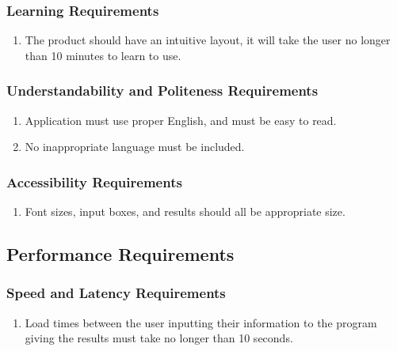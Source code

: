 \documentclass[english]{article}
\begin{document}

\subsubsection{Learning Requirements}
\label{ssub:learning_requirements}
\begin{enumerate}[{LR}1. ]
\item The product should have an intuitive layout, it will take the user no longer than 10 minutes to learn to use.
\end{enumerate}

\subsubsection{Understandability and Politeness Requirements}
\label{ssub:understandability_and_politeness_requirements}
\begin{enumerate}[{UPR}1. ]
\item Application must use proper English, and must be easy to read.

\item No inappropriate language must be included.
\end{enumerate}

\subsubsection{Accessibility Requirements}
\label{ssub:accessibility_requirements}
\begin{enumerate}[{ACR}1. ]
\item Font sizes, input boxes, and results should all be appropriate size.
\end{enumerate}


\subsection{Performance Requirements}
\label{sub:performance_requirements}

\subsubsection{Speed and Latency Requirements}
\label{ssub:speed_and_latency_requirements}
\begin{enumerate}[{SLR}1. ]
\item Load times between the user inputting their information to the program giving the results must take no longer than 10 seconds.
\end{enumerate}
\end{document}
